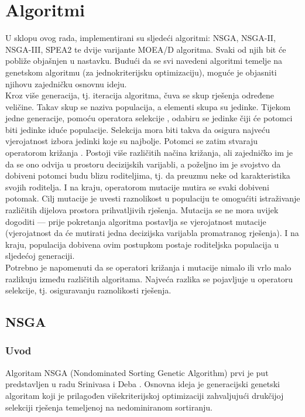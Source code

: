 \documentclass[times, utf8, zavrsni, numeric]{fer}
\begin{document}
\chapter{Algoritmi}
U sklopu ovog rada, implementirani su sljedeći algoritmi: NSGA, NSGA-II, \mbox{NSGA-III}, SPEA2 te dvije varijante MOEA/D algoritma. Svaki od njih bit će pobliže objašnjen u nastavku. Budući da se svi navedeni algoritmi temelje na genetskom algoritmu (za jednokriterijsku optimizaciju), moguće je objasniti njihovu zajedničku osnovnu ideju.\\
Kroz više generacija, tj. iteracija algoritma, čuva se skup rješenja određene veličine. Takav skup se naziva populacija, a elementi skupa su jedinke. Tijekom jedne generacije, pomoću operatora selekcije , odabiru se jedinke čiji će potomci biti jedinke iduće populacije. Selekcija mora biti takva da osigura najveću vjerojatnost izbora jedinki koje su najbolje. Potomci se zatim stvaraju operatorom križanja . Postoji više različitih načina križanja, ali zajedničko im je da se ono odvija u prostoru decizijskih varijabli, a poželjno im je svojstvo da dobiveni potomci budu blizu roditeljima, tj. da preuzmu neke od karakteristika svojih roditelja. I na kraju, operatorom mutacije  mutira se svaki dobiveni potomak. Cilj mutacije je uvesti raznolikost u populaciju te omogućiti istraživanje različitih dijelova prostora prihvatljivih rješenja. Mutacija se ne mora uvijek dogoditi --- prije pokretanja algoritma postavlja se vjerojatnost mutacije (vjerojatnost da će mutirati jedna decizijska varijabla promatranog rješenja). I na kraju, populacija dobivena ovim postupkom postaje roditeljska populacija u sljedećoj generaciji.\\
Potrebno je napomenuti da se operatori križanja i mutacije nimalo ili vrlo malo razlikuju između različitih algoritama. Najveća razlika se pojavljuje u operatoru selekcije, tj. osiguravanju raznolikosti rješenja.

\section{NSGA}
\subsection{Uvod}
Algoritam NSGA (Nondominated Sorting Genetic Algorithm) prvi je put predstavljen u radu Srinivasa i Deba \citep{nsga}. Osnovna ideja je generacijski genetski algoritam koji je prilagođen višekriterijskoj optimizaciji zahvaljujući drukčijoj selekciji rješenja temeljenoj na nedominiranom sortiranju. 
\end{document}
